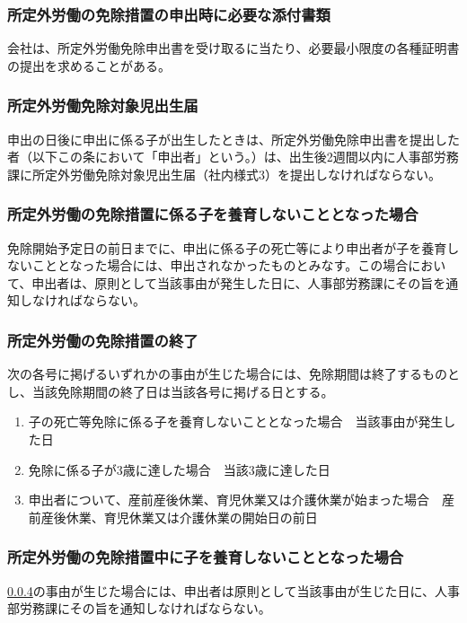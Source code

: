 \documentclass{jsarticle}
\begin{document}
\subsubsection{所定外労働の免除措置の申出時に必要な添付書類}
\label{育介_項_所定外労働の免除措置の申出時に必要な添付書類}
会社は、所定外労働免除申出書を受け取るに当たり、必要最小限度の各種証明書の提出を求めることがある。 

\subsubsection{所定外労働免除対象児出生届}
\label{育介_項_所定外労働免除対象児出生届}
申出の日後に申出に係る子が出生したときは、所定外労働免除申出書を提出した者（以下この条において「申出者」という。）は、出生後2週間以内に人事部労務課に所定外労働免除対象児出生届（社内様式3）を提出しなければならない。 

\subsubsection{所定外労働の免除措置に係る子を養育しないこととなった場合}
\label{育介_項_所定外労働の免除措置に係る子を養育しないこととなった場合}
免除開始予定日の前日までに、申出に係る子の死亡等により申出者が子を養育しないこととなった場合には、申出されなかったものとみなす。この場合において、申出者は、原則として当該事由が発生した日に、人事部労務課にその旨を通知しなければならない。

\subsubsection{所定外労働の免除措置の終了}
\label{育介_項_所定外労働の免除措置の終了}
次の各号に掲げるいずれかの事由が生じた場合には、免除期間は終了するものとし、当該免除期間の終了日は当該各号に掲げる日とする。 
\begin{enumerate}
  \item 子の死亡等免除に係る子を養育しないこととなった場合　当該事由が発生した日 
  \item 免除に係る子が3歳に達した場合　当該3歳に達した日 
  \item 申出者について、産前産後休業、育児休業又は介護休業が始まった場合　産前産後休業、育児休業又は介護休業の開始日の前日 
\end{enumerate}

\subsubsection{所定外労働の免除措置中に子を養育しないこととなった場合}
\label{育介_項_所定外労働の免除措置中に子を養育しないこととなった場合}
\ref{育介_項_所定外労働の免除措置の終了}の事由が生じた場合には、申出者は原則として当該事由が生じた日に、人事部労務課にその旨を通知しなければならない。 
\end{document}
